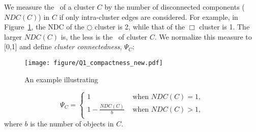 We measure the \cnn\ of a cluster $C$ by the number of disconnected components ($\mathit{NDC}(C)$) in $C$ 
if only intra-cluster edges are considered.
For example, in Figure~\ref{figure:compactness}, the NDC of the $\Circle$ cluster is 2, while that of the $\Box$ cluster is 1.
The larger $\mathit{NDC}(C)$ is, the less is the \cnn\ of cluster $C$.
We normalize this measure to [0,1] and define {\it cluster connectedness}, $\Psi_C$:


\begin{figure}
    \centering
        \texttt{[image: figure/Q1\_compactness\_new.pdf]}
        \caption{An example illustrating \cnn}
        \label{figure:compactness} %
\end{figure}


\begin{equation}
\label{eq:cluster_compactness}
\Psi_C=\left\{ \begin{array}{ll}
               1& \mbox{ when } \mathit{NDC}(C) = 1,\\
               1-\frac{\mathit{NDC}(C)}{b}& \mbox{ when } \mathit{NDC}(C) > 1,\\
              \end{array}
       \right.
\end{equation}
where $b$ is the number of objects in $C$.

